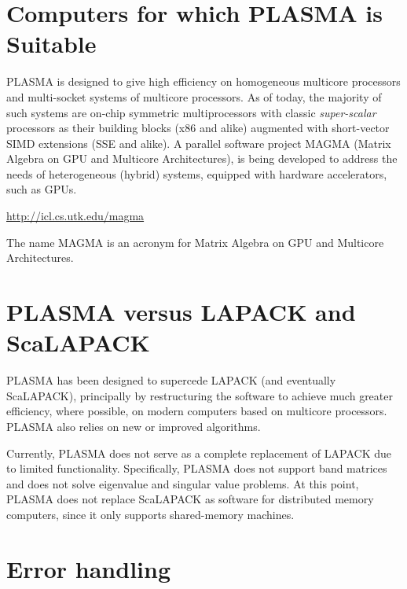 
\section{Computers for which PLASMA is Suitable}

PLASMA is designed to give high efficiency on homogeneous multicore processors and \mbox{multi-socket}
systems of multicore processors. As of today, the majority of such systems are \mbox{on-chip} symmetric
multiprocessors with classic \mbox{\em super-scalar} processors as their building blocks (x86 and alike)
augmented with \mbox{short-vector} SIMD extensions (SSE and alike).
A parallel software project MAGMA (Matrix Algebra on GPU and Multicore
Architectures), is being developed to address the needs of
heterogeneous (hybrid) systems, equipped with hardware accelerators,
such as GPUs.
\begin{link_url}
\url{http://icl.cs.utk.edu/magma}
\end{link_url}
The name MAGMA is an acronym for Matrix Algebra on GPU and Multicore Architectures.


\section{PLASMA versus LAPACK and ScaLAPACK}

PLASMA has been designed to supercede LAPACK (and eventually ScaLAPACK), principally by restructuring the software
to achieve much greater efficiency, where possible, on modern computers based on multicore processors.
PLASMA also relies on new or improved algorithms.

Currently, PLASMA does not serve as a complete replacement of LAPACK due to limited functionality.
Specifically, PLASMA does not support band matrices and does not solve eigenvalue and singular
value problems.
At this point, PLASMA does not replace ScaLAPACK as software for distributed memory computers, since it
only supports \mbox{shared-memory} machines.


\section{Error handling}

